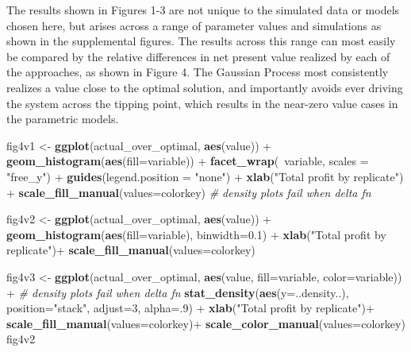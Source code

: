 \documentclass[author-year, review]{elsarticle} %
\newenvironment{Shaded}{}{}
\newcommand{\KeywordTok}[1]{\textcolor[rgb]{0.00,0.44,0.13}{\textbf{{#1}}}}
\newcommand{\DataTypeTok}[1]{\textcolor[rgb]{0.56,0.13,0.00}{{#1}}}
\newcommand{\DecValTok}[1]{\textcolor[rgb]{0.25,0.63,0.44}{{#1}}}
\newcommand{\FloatTok}[1]{\textcolor[rgb]{0.25,0.63,0.44}{{#1}}}
\newcommand{\StringTok}[1]{\textcolor[rgb]{0.25,0.44,0.63}{{#1}}}
\newcommand{\CommentTok}[1]{\textcolor[rgb]{0.38,0.63,0.69}{\textit{{#1}}}}
\newcommand{\NormalTok}[1]{{#1}}
\begin{document}
The results shown in Figures 1-3 are not unique to the simulated data or
models chosen here, but arises across a range of parameter values and
simulations as shown in the supplemental figures. The results across
this range can most easily be compared by the relative differences in
net present value realized by each of the approaches, as shown in Figure
4. The Gaussian Process most consistently realizes a value close to the
optimal solution, and importantly avoids ever driving the system across
the tipping point, which results in the near-zero value cases in the
parametric models.

\begin{Shaded}
\begin{Highlighting}[]
\NormalTok{fig4v1 <-}\StringTok{ }\KeywordTok{ggplot}\NormalTok{(actual_over_optimal, }\KeywordTok{aes}\NormalTok{(value)) +}\StringTok{ }\KeywordTok{geom_histogram}\NormalTok{(}\KeywordTok{aes}\NormalTok{(}\DataTypeTok{fill=}\NormalTok{variable)) +}\StringTok{ }
\StringTok{  }\KeywordTok{facet_wrap}\NormalTok{(~variable, }\DataTypeTok{scales =} \StringTok{"free_y"}\NormalTok{)  +}\StringTok{ }\KeywordTok{guides}\NormalTok{(}\DataTypeTok{legend.position =} \StringTok{"none"}\NormalTok{) +}
\StringTok{  }\KeywordTok{xlab}\NormalTok{(}\StringTok{"Total profit by replicate"}\NormalTok{) +}\StringTok{ }\KeywordTok{scale_fill_manual}\NormalTok{(}\DataTypeTok{values=}\NormalTok{colorkey) }\CommentTok{# density plots fail when delta fn}

\NormalTok{fig4v2 <-}\StringTok{ }\KeywordTok{ggplot}\NormalTok{(actual_over_optimal, }\KeywordTok{aes}\NormalTok{(value)) +}\StringTok{ }\KeywordTok{geom_histogram}\NormalTok{(}\KeywordTok{aes}\NormalTok{(}\DataTypeTok{fill=}\NormalTok{variable), }\DataTypeTok{binwidth=}\FloatTok{0.1}\NormalTok{) +}\StringTok{ }
\StringTok{  }\KeywordTok{xlab}\NormalTok{(}\StringTok{"Total profit by replicate"}\NormalTok{)+}\StringTok{ }\KeywordTok{scale_fill_manual}\NormalTok{(}\DataTypeTok{values=}\NormalTok{colorkey)}

\NormalTok{fig4v3 <-}\StringTok{ }\KeywordTok{ggplot}\NormalTok{(actual_over_optimal, }\KeywordTok{aes}\NormalTok{(value, }\DataTypeTok{fill=}\NormalTok{variable, }\DataTypeTok{color=}\NormalTok{variable)) +}\StringTok{ }\CommentTok{# density plots fail when delta fn}
\StringTok{  }\KeywordTok{stat_density}\NormalTok{(}\KeywordTok{aes}\NormalTok{(}\DataTypeTok{y=}\NormalTok{..density..), }\DataTypeTok{position=}\StringTok{"stack"}\NormalTok{, }\DataTypeTok{adjust=}\DecValTok{3}\NormalTok{, }\DataTypeTok{alpha=}\NormalTok{.}\DecValTok{9}\NormalTok{) +}\StringTok{ }
\StringTok{  }\KeywordTok{xlab}\NormalTok{(}\StringTok{"Total profit by replicate"}\NormalTok{)+}\StringTok{ }\KeywordTok{scale_fill_manual}\NormalTok{(}\DataTypeTok{values=}\NormalTok{colorkey)+}\StringTok{ }\KeywordTok{scale_color_manual}\NormalTok{(}\DataTypeTok{values=}\NormalTok{colorkey)}
\NormalTok{fig4v2}
\end{Highlighting}
\end{Shaded}
\end{document}

